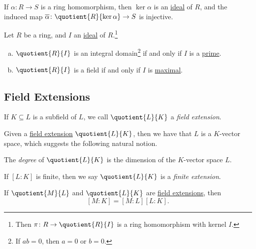 \begin{theorem}
	If \(\alpha \colon R \to S\) is a ring homomorphism, then \(\ker \alpha \) is an \hyperref[def:ideal]{ideal} of \(R\), and the induced map \(\overline{\alpha} \colon \quotient{R}{\ker \alpha } \to S\) is injective.
\end{theorem}

\begin{theorem}
	Let \(R\) be a ring, and \(I\) an \hyperref[def:ideal]{ideal} of \(R\).\footnote{Then \(\pi \colon R \to \quotient{R}{I} \) is a ring homomorphism with kernel \(I\).}
	\begin{enumerate}[(a)]
		\item \(\quotient{R}{I} \) is an integral domain\footnote{If \(ab=0\), then \(a=0\) or \(b=0\).} if and only if \(I\) is a \hyperref[def:prime]{prime}.
		\item \(\quotient{R}{I} \) is a field if and only if \(I\) is \hyperref[def:proper-ideal-maximal]{maximal}.
	\end{enumerate}
\end{theorem}

\subsection{Field Extensions}
\begin{definition}\label{def:field-extension}
	If \(K \subseteq L\) is a subfield of \(L\), we call \(\quotient{L}{K} \) a \emph{field extension}.
\end{definition}

Given a \hyperref[def:field-extension]{field extension} \(\quotient{L}{K} \), then we have that \(L\) is a \(K\)-vector space, which suggests the following natural notion.

\begin{definition}[Degree]\label{def:degree}
	The \emph{degree} of \(\quotient{L}{K} \) is the dimension of the \(K\)-vector space \(L\).
\end{definition}

\begin{notation}
	If \([L\colon K]\) is finite, then we say \(\quotient{L}{K} \) is a \emph{finite extension}.
\end{notation}

\begin{theorem}\label{thm:lec11-1}
	If \(\quotient{M}{L} \) and \(\quotient{L}{K} \) are \hyperref[def:field-extension]{field extensions}, then
	\[
		[M\colon K] = [M \colon L] [L \colon K].
	\]
\end{theorem}

